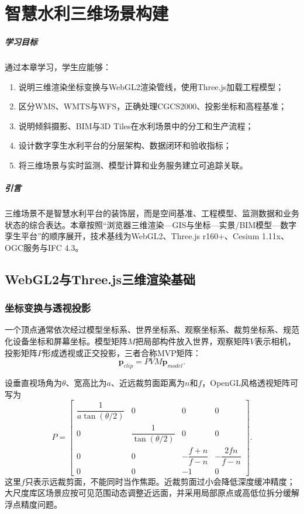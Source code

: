 \chapter{智慧水利三维场景构建}

\paragraph*{学习目标}

通过本章学习，学生应能够：
\begin{enumerate}
\item 说明三维渲染坐标变换与WebGL2渲染管线，使用Three.js加载工程模型；
\item 区分WMS、WMTS与WFS，正确处理CGCS2000、投影坐标和高程基准；
\item 说明倾斜摄影、BIM与3D Tiles在水利场景中的分工和生产流程；
\item 设计数字孪生水利平台的分层架构、数据闭环和验收指标；
\item 将三维场景与实时监测、模型计算和业务服务建立可追踪关联。
\end{enumerate}

\paragraph*{引言}

三维场景不是智慧水利平台的装饰层，而是空间基准、工程模型、监测数据和业务状态的综合表达。本章按照“浏览器三维渲染—GIS与坐标—实景/BIM模型—数字孪生平台”的顺序展开，技术基线为WebGL2、Three.js r160+、Cesium 1.11x、OGC服务与IFC 4.3。

\section{WebGL2与Three.js三维渲染基础}

\subsection{坐标变换与透视投影}

一个顶点通常依次经过模型坐标系、世界坐标系、观察坐标系、裁剪坐标系、规范化设备坐标和屏幕坐标。模型矩阵$M$把局部构件放入世界，观察矩阵$V$表示相机，投影矩阵$P$形成透视或正交投影，三者合称MVP矩阵：
\[
  \mathbf{p}_{clip}=PVM\mathbf{p}_{model}.
\]

设垂直视场角为$\theta$、宽高比为$a$、近远裁剪面距离为$n$和$f$，OpenGL风格透视矩阵可写为
\[
P=\begin{bmatrix}
\dfrac{1}{a\tan(\theta/2)}&0&0&0\\
0&\dfrac{1}{\tan(\theta/2)}&0&0\\
0&0&-\dfrac{f+n}{f-n}&-\dfrac{2fn}{f-n}\\
0&0&-1&0
\end{bmatrix}.
\]
这里$f$只表示远裁剪面，不能同时当作焦距。近裁剪面过小会降低深度缓冲精度；大尺度库区场景应按可见范围动态调整近远面，并采用局部原点或高低位拆分缓解浮点精度问题。

